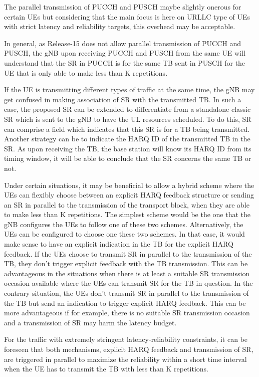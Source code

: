 \documentclass[conference]{IEEEtran}
\begin{document}
The parallel transmission of PUCCH and PUSCH maybe slightly onerous for certain UEs but considering that the main focus is here on URLLC type of UEs with strict latency and reliability targets, this overhead may be acceptable.

In general, as Release-15 does not allow parallel transmission of PUCCH and PUSCH, the gNB upon receiving PUCCH and PUSCH from the same UE will understand that the SR in PUCCH is for the same TB sent in PUSCH for the UE that is only able to make less than K repetitions.

If the UE is transmitting different types of traffic at the same time, the gNB may get confused in making association of SR with the transmitted TB. In such a case, the proposed SR can be extended to differentiate from a standalone classic SR which is sent to the gNB to have the UL resources scheduled.  To do this, SR can comprise a field which indicates that this SR is for a TB being transmitted. Another strategy can be to indicate the HARQ ID of the transmitted TB in the SR. As upon receiving the TB, the base station will know its HARQ ID from its timing window, it will be able to conclude that the SR concerns the same TB or not.

Under certain situations, it may be beneficial to allow a hybrid scheme where the UEs can flexibly choose between an explicit HARQ feedback structure or sending an SR in parallel to the transmission of the transport block, when they are able to make less than K repetitions. The simplest scheme would be the one that the gNB configures the UEs to follow one of these two schemes. Alternatively, the UEs can be configured to choose one these two schemes. In that case, it would make sense to have an explicit indication in the TB for the explicit HARQ feedback. If the UEs choose to transmit SR in parallel to the transmission of the TB, they don’t trigger explicit feedback with the TB transmission. This can be advantageous in the situations when there is at least a suitable SR transmission occasion available where the UEs can transmit SR for the TB in question. In the contrary situation, the UEs don’t transmit SR in parallel to the transmission of the TB but send an indication to trigger explicit HARQ feedback. This can be more advantageous if for example, there is no suitable SR transmission occasion and a transmission of SR may harm the latency budget.

For the traffic with extremely stringent latency-reliability constraints, it can be foreseen that both mechanisms, explicit HARQ feedback and transmission of SR, are triggered in parallel to maximize the reliability within a short time interval when the UE has to transmit the TB with less than K repetitions.
\end{document}

